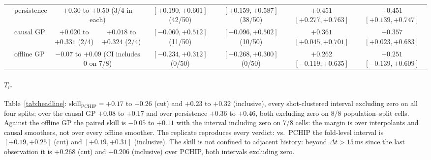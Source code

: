 \documentclass[10pt,twocolumn,letterpaper]{article}
\newcommand{\Ti}{\ensuremath{T_i}}
\newcommand{\skillp}{\ensuremath{\mathrm{skill}_{\mathrm{PCHIP}}}}
\begin{document}
\begin{table}[t]
{\begin{tabular}{llcccccc}
      & persistence & \multicolumn{2}{c}{$+0.30$ to $+0.50$ (3/4 in each)} & $\mathbf{[+0.190, +0.601]}$ (42/50) & $\mathbf{[+0.159, +0.587]}$ (38/50) & $+0.451$ $\mathbf{[+0.277, +0.763]}$ & $+0.451$ $\mathbf{[+0.139, +0.747]}$ \\
      & causal GP   & $+0.020$ to $+0.331$ (2/4) & $+0.018$ to $+0.324$ (2/4) & $[-0.060, +0.512]$ (11/50) & $[-0.096, +0.502]$ (10/50) & $+0.361$ $\mathbf{[+0.045, +0.701]}$ & $+0.357$ $\mathbf{[+0.023, +0.683]}$ \\
      & offline GP  & \multicolumn{2}{c}{$-0.07$ to $+0.09$ (CI includes 0 on 7/8)} & $[-0.234, +0.312]$ (0/50) & $[-0.268, +0.300]$ (0/50) & $+0.262$ $[-0.119, +0.635]$ & $+0.251$ $[-0.139, +0.609]$ \\
    \bottomrule
  \end{tabular}}
\end{table}

\paragraph{\Ti{}.} Table~\ref{tab:headline}: $\skillp = +0.17$ to $+0.26$ (cut) and
$+0.23$ to $+0.32$ (inclusive), every shot-clustered interval excluding zero on all
four splits; over the causal GP $+0.08$ to $+0.17$ and over persistence $+0.36$ to
$+0.46$, both excluding zero on 8/8 population--split cells. Against the offline GP
the paired skill is $-0.05$ to $+0.11$ with the interval including zero on 7/8 cells:
the margin is over interpolants and causal smoothers, not over every offline smoother.
The replicate reproduces every verdict: vs.\ PCHIP the fold-level interval is
$[+0.19, +0.25]$ (cut) and $[+0.19, +0.31]$ (inclusive). The skill is not
confined to adjacent history: beyond $\Delta t > 15$\,ms since the last observation it
is $+0.268$ (cut) and $+0.206$ (inclusive) over PCHIP, both intervals excluding zero.
\end{document}
